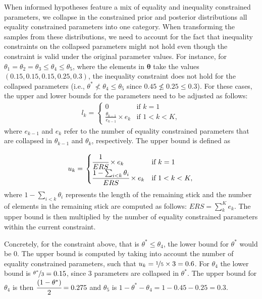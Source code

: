 \begin{appendix}
When informed hypotheses feature a mix of equality and inequality
constrained parameters, we collapse in the constrained prior and
posterior distributions all equality constrained parameters into one
category. When transforming the samples from these distributions, we
need to account for the fact that inequality constraints on the
collapsed parameters might not hold even though the constraint is valid
under the original parameter values. For instance, for
\(\theta_1 = \theta_2 = \theta_3 \leq \theta_4 \leq \theta_5\), where
the elements in \(\boldsymbol{\theta}\) take the values
\((0.15, 0.15, 0.15, 0.25, 0.3)\), the inequality constraint does not
hold for the collapsed parameters (i.e.,
\(\theta^* \nless \theta_4 \leq \theta_5\) since
\(0.45 \nleq 0.25 \leq 0.3\)). For these cases, the upper and lower
bounds for the parameters need to be adjusted as follows: \begin{align}
  l_k = \left.
  \begin{cases}
      0 & \text{if } k = 1 \\
      \frac{\theta_{k - 1}}{e_{k-1}} \times e_k & \text{if } 1 < k < K,
  \end{cases}
    \right.
\end{align} where \(e_{k-1}\) and \(e_k\) refer to the number of
equality constrained parameters that are collapsed in \(\theta_{k - 1}\)
and \(\theta_{k}\), respectively. The upper bound is defined as

\begin{align}
  u_k = \left.
  \begin{cases}
      \cfrac{1}{ERS} \times e_k & \text{if } k = 1 \\
      \cfrac{1 - \sum_{i < k} \theta_i}{ERS} \times e_k & \text{if } 1 < k < K,
  \end{cases}
    \right.
\end{align} where \(1 - \sum_{i < k} \theta_i\) represents the length of
the remaining stick and the number of elements in the remaining stick
are computed as follows: \(ERS = \sum_k^{K} e_k\). The upper bound is
then multiplied by the number of equality constrained parameters within
the current constraint.

Concretely, for the constraint above, that is
\(\theta^* \leq \theta_4\), the lower bound for \(\theta^*\) would be
\(0\). The upper bound is computed by taking into account the number of
equality constrained parameters, such that
\(u_k = \nicefrac{1}{5} \times 3 = 0.6\). For \(\theta_4\) the lower
bound is \(\nicefrac{\theta^*}{3} = 0.15\), since \(3\) parameters are
collapsed in \(\theta^*\). The upper bound for \(\theta_4\) is then
\(\cfrac{(1 - \theta^*)}{2} = 0.275\) and \(\theta_5\) is
\(1 - \theta^* - \theta_4 = 1 - 0.45 - 0.25 = 0.3\).


\end{appendix}
